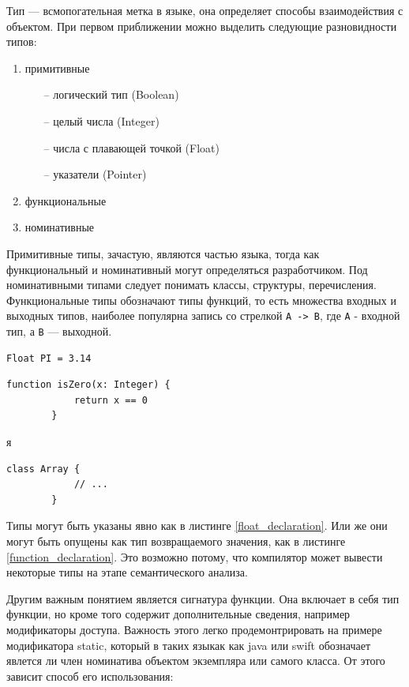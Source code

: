 \documentclass[times]{itmo-student-thesis}
\begin{document}
	Тип --- всмопогательная метка в языке, она определяет способы взаимодействия с объектом. При первом приближении можно выделить следующие разновидности типов: 
	\begin{enumerate} 
		\item примитивные
		\begin{enumerate} 
			\item[--] логический тип (Boolean)
			\item[--] целый числа (Integer)
			\item[--] числа с плавающей точкой (Float)
			\item[--] указатели (Pointer)
		\end{enumerate} 
		\item функциональные
		\item номинативные
	\end{enumerate}
	
	Примитивные типы, зачастую, являются частью языка, тогда как функциональный и номинативный могут определяться разработчиком. Под номинативными типами следует понимать классы, структуры, перечисления. Функциональные типы обозначают типы функций, то есть множества входных и выходных типов, наиболее популярна запись со стрелкой  \lstinline{A -> B}, где  \lstinline{A}  - входной тип, а  \lstinline{B} --- выходной.
	
	\begin{lstlisting}[float=!h,caption={Пример объявления и инициализации переменной типа $Float$},label={float_declaration}]
		Float PI = 3.14
	\end{lstlisting}
	
	\begin{lstlisting}[float=!h,caption={Пример функции типа  \lstinline{Integer -> Boolean}},label={function_declaration}]
		function isZero(x: Integer) {
			return x == 0
		}
	\end{lstlisting}я
	
	\begin{lstlisting}[caption={Пример объявления класса}]
		class Array {
			// ...
		}
	\end{lstlisting}
	
	Типы могут быть указаны явно как в листинге \ref{float_declaration}. Или же они могут быть опущены как тип возвращаемого значения, как в листинге \ref{function_declaration}. Это возможно потому, что компилятор может вывести некоторые типы на этапе семантического анализа.
	
	Другим важным понятием является сигнатура функции. Она включает в себя тип функции, но кроме того содержит дополнительные сведения, например модификаторы доступа. Важность этого легко продемонтрировать на примере модификатора static, который в таких языкак как java или swift обозначает явлется ли член номинатива объектом экземпляра или самого класса. От этого зависит способ его использования:
	
\end{document}

